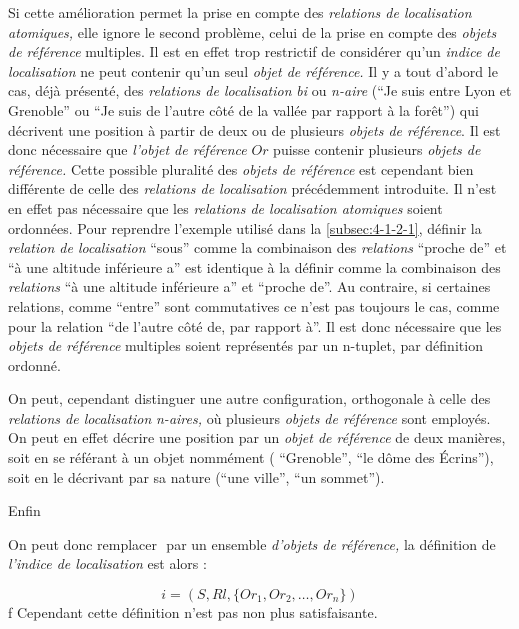 Si cette amélioration permet la prise en compte des \emph{relations de
  localisation atomiques,} elle ignore le second problème, celui de la
prise en compte des \emph{objets de référence} multiples. Il est en
effet trop restrictif de considérer qu'un \emph{indice de
  localisation} ne peut contenir qu'un seul \emph{objet de référence.}
Il y a tout d'abord le cas, déjà présenté, des \emph{relations de
  localisation} \emph{bi} ou \emph{n-aire} (\eg \enquote{Je suis entre
  Lyon et Grenoble} ou \enquote{Je suis de l'autre côté de la vallée
  par rapport à la forêt}) qui décrivent une position à partir de deux
ou de plusieurs \emph{objets de référence}. Il est donc nécessaire que
\emph{l'objet de référence} \(Or\) puisse contenir plusieurs
\emph{objets de référence.} Cette possible pluralité des \emph{objets
  de référence} est cependant bien différente de celle des
\emph{relations de localisation} précédemment introduite. Il n'est en
effet pas nécessaire que les \emph{relations de localisation
  atomiques} soient ordonnées. Pour reprendre l'exemple utilisé dans
la \autoref{subsec:4-1-2-1}, définir la \emph{relation de
  localisation} \enquote{sous} comme la combinaison des
\emph{relations} \enquote{proche de} et \enquote{à une altitude
  inférieure a} est identique à la définir comme la combinaison des
\emph{relations} \enquote{à une altitude inférieure a} et
\enquote{proche de}. Au contraire, si certaines relations, comme
\enquote{entre} sont commutatives ce n'est pas toujours le cas, comme
pour la relation \enquote{de l'autre côté de, par rapport à}. Il est
donc nécessaire que les \emph{objets de référence} multiples soient
représentés par un n-tuplet, par définition ordonné.

On peut, cependant distinguer une autre configuration, orthogonale à
celle des \emph{relations de localisation} \emph{n-aires,} où
plusieurs \emph{objets de référence} sont employés. On peut en effet
décrire une position par un \emph{objet de référence} de deux
manières, soit en se référant à un objet nommément (\eg
\enquote{Grenoble}, \enquote{le dôme des Écrins}), soit en le
décrivant par sa nature (\eg \enquote{une ville}, \enquote{un
  sommet}).



Enfin

On peut donc remplacer \(\) par un ensemble \emph{d'objets de
  référence,} la définition de \emph{l'indice de localisation} est
alors :

\begin{equation}
  i = (S, Rl, \{Or_1, Or_2, \ldots, Or_n\})
\end{equation}
f
Cependant cette définition n'est pas non plus satisfaisante.

